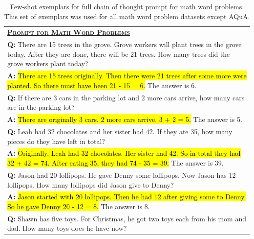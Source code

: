 \begingroup
\begin{table}[H]
    \centering
    \small
    \caption{
    Few-shot exemplars for full chain of thought prompt for math word problems. This set of exemplars was used for all math word problem datasets except AQuA. 
    }
    \begin{tabular}{p{\linewidth}}
        \toprule
        \underline{\textbf{\textsc{Prompt for Math Word Problems}}} \\
        \vspace{-2mm}
        \textbf{Q:} There are 15 trees in the grove. Grove workers will plant trees in the grove today. After they are done, there will be 21 trees. How many trees did the grove workers plant today? \\
        \vspace{-1mm}
        \textbf{A:} \hl{There are 15 trees originally. Then there were 21 trees after some more were planted. So there must have been 21 - 15 = 6.} The answer is 6. \\
        \vspace{0mm}
        \textbf{Q:} If there are 3 cars in the parking lot and 2 more cars arrive, how many cars are in the parking lot? \\
        \vspace{-1mm}
        \textbf{A:} \hl{There are originally 3 cars. 2 more cars arrive. 3 + 2 = 5.}  The answer is 5. \\
        \vspace{0mm}
        \textbf{Q:} Leah had 32 chocolates and her sister had 42. If they ate 35, how many pieces do they have left in total? \\
        \vspace{-1mm}
        \textbf{A:} \hl{Originally, Leah had 32 chocolates. Her sister had 42. So in total they had 32 + 42 = 74. After eating 35, they had 74 - 35 = 39.} The answer is 39. \\
        \vspace{0mm}
        \textbf{Q:} Jason had 20 lollipops. He gave Denny some lollipops. Now Jason has 12 lollipops. How many lollipops did Jason give to Denny? \\
        \vspace{-1mm}
        \textbf{A:} \hl{Jason started with 20 lollipops. Then he had 12 after giving some to Denny. So he gave Denny 20 - 12 = 8.} The answer is 8. \\
        \vspace{0mm}
        \textbf{Q:} Shawn has five toys. For Christmas, he got two toys each from his mom and dad. How many toys does he have now? \\

\end{tabular}
\end{table}

